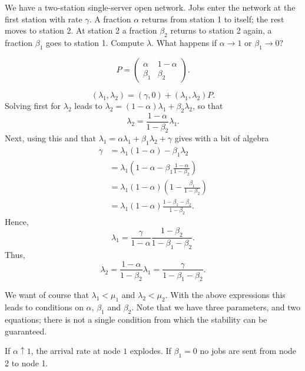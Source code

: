 \begin{exercise}[\faCalculator]\label{ex:47}
  We have a two-station single-server open network.
  Jobs enter the network at the first station with rate $\gamma$.
  A fraction $\alpha$ returns from station 1 to itself; the rest moves to station 2. At station 2 a fraction $\beta_2$ returns to station 2 again, a fraction $\beta_1$ goes to station 1.  Compute $\lambda$. What happens if $\alpha\to 1$ or $\beta_1\to 0$? 
\begin{solution}
  \begin{equation*}
    P = 
    \begin{pmatrix}
      \alpha & 1- \alpha \\
      \beta_1 & \beta_2
    \end{pmatrix}.
  \end{equation*}

  \begin{equation*}
    (\lambda_1, \lambda_2) = (\gamma, 0) + (\lambda_1, \lambda_2) P.
  \end{equation*}
Solving first for $\lambda_2$ leads to $\lambda_2 = (1-\alpha) \lambda_1 + \beta_2 \lambda_2$, so that  
\begin{equation*}
  \lambda_2 = \frac{1-\alpha}{1-\beta_2} \lambda_1. 
\end{equation*}
Next, using this and that $\lambda_1 = \alpha \lambda_1 + \beta_1 \lambda_2 + \gamma$ gives with a bit of algebra
\begin{equation*}
  \begin{split}
\gamma 
&=  \lambda_1(1-\alpha) - \beta_1\lambda_2 \\
&=  \lambda_1\left(1-\alpha - \beta_1\frac{1-\alpha}{1-\beta_2}\right) \\
&=  \lambda_1(1-\alpha)\left(1 - \frac{\beta_1 }{1-\beta_2}\right) \\
&=  \lambda_1(1-\alpha)\frac{1-\beta_1-\beta_2 }{1-\beta_2}.
  \end{split}
\end{equation*}
Hence, 
\begin{equation*}
  \lambda_1 = \frac\gamma{1-\alpha}\frac{1-\beta_2}{1-\beta_1-\beta_2}. 
\end{equation*}
Thus, 
\begin{equation*}
  \lambda_2 = \frac{1-\alpha}{1-\beta_2} \lambda_1 = \frac\gamma{1-\beta_1-\beta_2}. 
\end{equation*}


We want of course that $\lambda_1 < \mu_1$ and $\lambda_2 < \mu_2$.
With the above expressions this leads to conditions on $\alpha$, $\beta_1$ and $\beta_2$.
Note that we have three parameters, and two equations; there is not a single condition from which the stability can be guaranteed.

If $\alpha\uparrow 1$, the arrival rate at node $1$ explodes.
If $\beta_1=0$ no jobs are sent from node 2 to node 1.
\end{solution}
\end{exercise}

